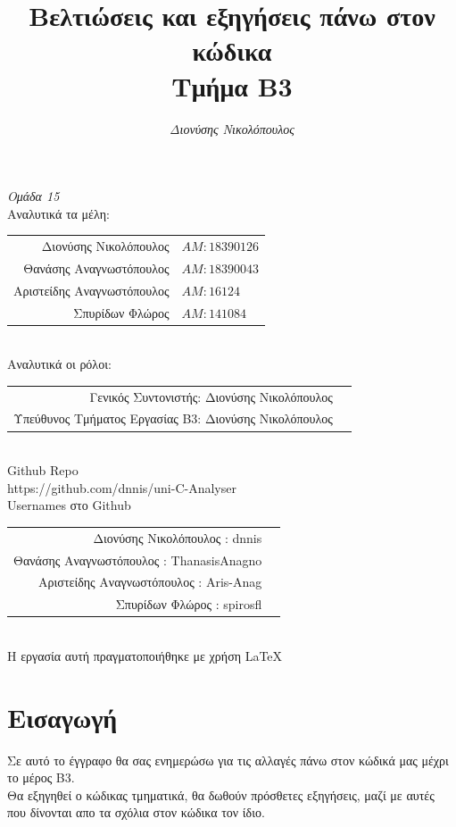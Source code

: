 \documentclass[14pt]{extarticle}
\title{\bf Βελτιώσεις και εξηγήσεις πάνω στον κώδικα \\ Τμήμα B3}
\author{
  \emph{Διονύσης Νικολόπουλος}
}
\begin{document}
\maketitle
\clearpage
\tableofcontents
\clearpage
  \begin{center}
    \large \emph{Ομάδα 15}
    \\
    Αναλυτικά τα μέλη:
\vspace{5mm}
  \begin{tabular}{r l}
    \\Διονύσης Νικολόπουλος & $AM: 18390126$
    \\Θανάσης Αναγνωστόπουλος & $AM: 18390043$
    \\Αριστείδης Αναγνωστόπουλος & $AM: 16124$
    \\Σπυρίδων Φλώρος & $AM: 141084$
  \end{tabular}
\vspace{5mm}
    \\
    Αναλυτικά οι ρόλοι:
    \\
\vspace{5mm}
  \begin{tabular}{r l}
    \small Γενικός Συντονιστής:   Διονύσης Νικολόπουλος
    \\
    \small Υπεύθυνος Τμήματος Εργασίας B3: Διονύσης Νικολόπουλος
  \end{tabular}
\vspace{5mm}
\\
  \textlatin{Github Repo}
  \\
  https://github.com/dnnis/uni-C-Analyser
  \vspace{5mm}
\\
  \textlatin{Usernames} στο \textlatin{Github}
\\
  \vspace{5mm}
  \begin{tabular}{r l}
    \small Διονύσης Νικολόπουλος : \textlatin{dnnis}
    \\
    \small Θανάσης Αναγνωστόπουλος : \textlatin{ThanasisAnagno}
    \\
    \small Αριστείδης Αναγνωστόπουλος : \textlatin{Aris-Anag}
    \\
    \small Σπυρίδων Φλώρος : \textlatin{spirosfl}
  \end{tabular}
  \\
\vspace*{\fill}
    \footnotesize{Η εργασία αυτή πραγματοποιήθηκε με χρήση \LaTeX}
  \end{center}
\clearpage
\section{Εισαγωγή}
Σε αυτό το έγγραφο θα σας ενημερώσω για τις αλλαγές πάνω στον κώδικά μας μέχρι
το μέρος Β3.
\\
Θα εξηγηθεί ο κώδικας τμηματικά, θα δωθούν πρόσθετες εξηγήσεις, μαζί με αυτές που
δίνονται απο τα σχόλια στον κώδικα τον ίδιο.
\\
\end{document}
